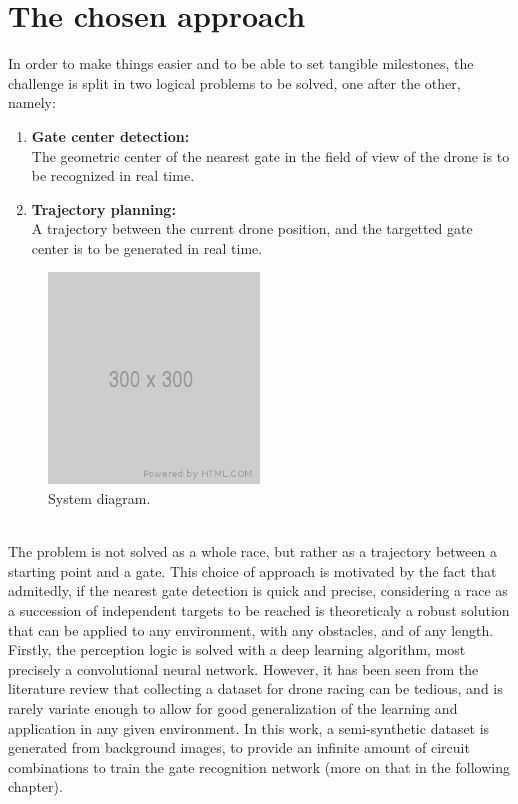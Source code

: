 \section{The chosen approach}


In order to make things easier and to be able to set tangible milestones, the
challenge is split in two logical problems to be solved, one after the
other, namely:
\begin{enumerate}
	\item{\textbf{Gate center detection:\\}
			The geometric center of the nearest gate in the field of view of the
			drone is to be recognized in real time.
	}
	\item{\textbf{Trajectory planning:\\}
			A trajectory between the current drone position, and the targetted gate
			center is to be generated in real time.
	}
\end{enumerate}

\begin{figure}[h]
	\centering
	\includegraphics[width=0.5\textwidth]{figure/300x300.png}
	\caption{System diagram.}
	\label{fig:system}
\end{figure}

~\\The problem is not solved as a whole race, but rather as a trajectory
between a starting point and a gate. This choice of approach is motivated by
the fact that admitedly, if the nearest gate detection is quick and precise,
considering a race as a succession of independent targets to be reached is
theoreticaly a robust solution that can be applied to any environment, with any
obstacles, and of any length.\\

Firstly, the perception logic is solved with a deep learning algorithm, most
precisely a convolutional neural network. However, it has been seen from
the literature review that collecting a dataset for drone racing can be
tedious, and is rarely variate enough to allow for good generalization of the
learning and application in any given environment. In this work, a
semi-synthetic dataset is generated from background images, to provide an
infinite amount of circuit combinations to train the gate recognition network
(more on that in the following chapter).

